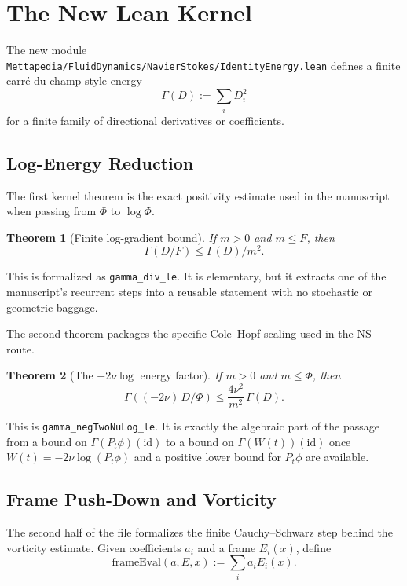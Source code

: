 \documentclass[11pt]{article}
\newtheorem{theorem}{Theorem}[section]
\theoremstyle{remark}
\begin{document}
\section{The New Lean Kernel}

The new module
\texttt{Mettapedia/FluidDynamics/NavierStokes/IdentityEnergy.lean}
defines a finite carré-du-champ style energy
\[
  \Gamma(D) := \sum_i D_i^2
\]
for a finite family of directional derivatives or coefficients.

\subsection{Log-Energy Reduction}

The first kernel theorem is the exact positivity estimate used in the manuscript
when passing from \(\Phi\) to \(\log \Phi\).

\begin{theorem}[Finite log-gradient bound]
If \(m > 0\) and \(m \le F\), then
\[
  \Gamma(D/F) \le \Gamma(D) / m^2.
\]
\end{theorem}

\noindent
This is formalized as \texttt{gamma\_div\_le}.  It is elementary, but it
extracts one of the manuscript's recurrent steps into a reusable statement with
no stochastic or geometric baggage.

The second theorem packages the specific Cole--Hopf scaling used in the NS
route.

\begin{theorem}[The \(-2\nu \log\) energy factor]
If \(m > 0\) and \(m \le \Phi\), then
\[
  \Gamma\!\left((-2\nu)\,D/\Phi\right)
  \le \frac{4\nu^2}{m^2}\,\Gamma(D).
\]
\end{theorem}

\noindent
This is \texttt{gamma\_negTwoNuLog\_le}.  It is exactly the algebraic part of
the passage from a bound on \(\Gamma(P_t \phi)(\mathrm{id})\) to a bound on
\(\Gamma(W(t))(\mathrm{id})\) once \(W(t) = -2\nu \log(P_t \phi)\) and a
positive lower bound for \(P_t \phi\) are available.

\subsection{Frame Push-Down and Vorticity}

The second half of the file formalizes the finite Cauchy--Schwarz step behind
the vorticity estimate.  Given coefficients \(a_i\) and a frame \(E_i(x)\), define
\[
  \mathrm{frameEval}(a,E,x) := \sum_i a_i E_i(x).
\]
\end{document}
